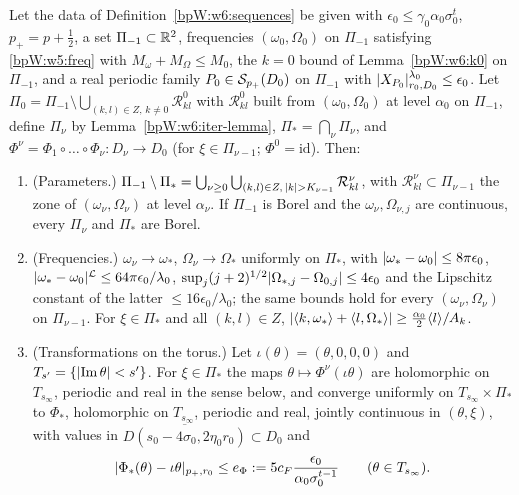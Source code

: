 \begin{proposition}\label{bpW:w6:convergence}
Let the data of Definition~\ref{bpW:w6:sequences} be given with $\epsilon_0\le\gamma_0\alpha_0\sigma_0^t$, $p_+=p+\frac12$, a set
$\Pi_{-1}\subset\mathbb{R}^2$, frequencies $(\omega_0,\Omega_0)$ on $\Pi_{-1}$ satisfying \eqref{bpW:w5:freq} with $M_\omega+M_\Omega\le M_0$, the
$k=0$ bound of Lemma~\ref{bpW:w6:k0} on $\Pi_{-1}$, and a real periodic family $P_0\in\mathcal S_{p_+}(D_0)$ on $\Pi_{-1}$ with
$\lvert X_{P_0}\rvert^{\lambda_0}_{r_0,D_0}\le\epsilon_0$. Let
$\Pi_0=\Pi_{-1}\setminus\bigcup_{(k,l)\in Z,\,k\ne0}\mathcal R^0_{kl}$ with $\mathcal R^0_{kl}$ built from $(\omega_0,\Omega_0)$ at level
$\alpha_0$ on $\Pi_{-1}$, define $\Pi_\nu$ by Lemma~\ref{bpW:w6:iter-lemma}, $\Pi_*=\bigcap_\nu\Pi_\nu$, and
$\Phi^\nu=\Phi_1\circ\dots\circ\Phi_\nu:D_\nu\to D_0$ (for $\xi\in\Pi_{\nu-1}$; $\Phi^0=\mathrm{id}$). Then:
\begin{enumerate}[label=(\roman*)]
\item (Parameters.) $\Pi_{-1}\setminus\Pi_*=\bigcup_{\nu\ge0}\bigcup_{(k,l)\in Z,\,\lvert k\rvert>K_{\nu-1}}\mathcal R^\nu_{kl}$, with
  $\mathcal R^\nu_{kl}\subset\Pi_{\nu-1}$ the zone of $(\omega_\nu,\Omega_\nu)$ at level $\alpha_\nu$. If $\Pi_{-1}$ is Borel and the
  $\omega_\nu,\Omega_{\nu,j}$ are continuous, every $\Pi_\nu$ and $\Pi_*$ are Borel.
\item (Frequencies.) $\omega_\nu\to\omega_*$, $\Omega_\nu\to\Omega_*$ uniformly on $\Pi_*$, with
  $\lvert \omega_*-\omega_0\rvert\le8\pi\epsilon_0$, $\lvert \omega_*-\omega_0\rvert^{\mathcal L}\le64\pi\epsilon_0/\lambda_0$,
  $\sup_j(j+2)^{1/2}\lvert \Omega_{*,j}-\Omega_{0,j}\rvert\le4\epsilon_0$ and the Lipschitz constant of the latter $\le16\epsilon_0/\lambda_0$; the
  same bounds hold for every $(\omega_\nu,\Omega_\nu)$ on $\Pi_{\nu-1}$. For $\xi\in\Pi_*$ and all $(k,l)\in Z$,
  $\lvert \langle k,\omega_*\rangle+\langle l,\Omega_*\rangle\rvert\ge\frac{\alpha_0}2\langle l\rangle/A_k$.
\item (Transformations on the torus.) Let $\iota(\theta)=(\theta,0,0,0)$ and $T_{s'}=\{\lvert \operatorname{Im}\theta\rvert<s'\}$. For
  $\xi\in\Pi_*$ the maps $\theta\mapsto\Phi^\nu(\iota\theta)$ are holomorphic on $T_{s_\infty}$, periodic and real in the sense below,
  and converge uniformly on $T_{s_\infty}\times\Pi_*$ to $\Phi_*$, holomorphic on $T_{s_\infty}$, periodic and real, jointly continuous in
  $(\theta,\xi)$, with values in $\overline{D(s_0-4\sigma_0,2\eta_0r_0)}\subset D_0$ and
  \[\lvert \Phi_*(\theta)-\iota\theta\rvert_{p_+,r_0}\le e_\Phi:=5c_F\frac{\epsilon_0}{\alpha_0\sigma_0^{t-1}}\qquad(\theta\in T_{s_\infty}).\]

\end{enumerate}
\end{proposition}
